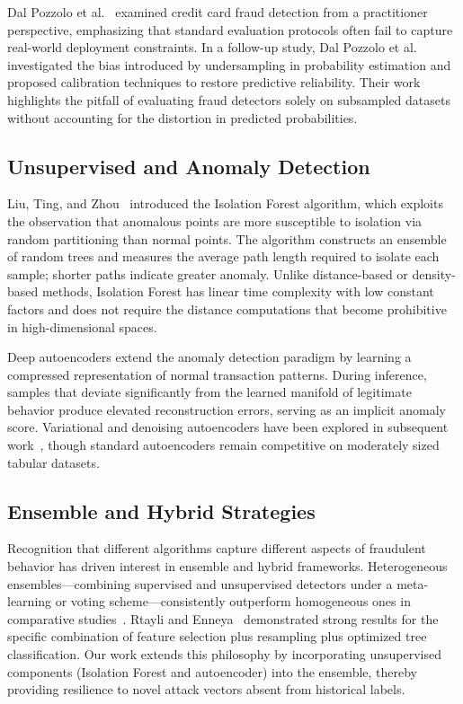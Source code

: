 \documentclass[conference,10pt]{IEEEtran}
\begin{document}
Dal Pozzolo et al.~\cite{dal2014learned} examined credit card fraud detection from a practitioner perspective, emphasizing that standard evaluation protocols often fail to capture real-world deployment constraints. In a follow-up study, Dal Pozzolo et al.~\cite{dal2015calibrating} investigated the bias introduced by undersampling in probability estimation and proposed calibration techniques to restore predictive reliability. Their work highlights the pitfall of evaluating fraud detectors solely on subsampled datasets without accounting for the distortion in predicted probabilities.

\subsection{Unsupervised and Anomaly Detection}
Liu, Ting, and Zhou~\cite{liu2008isolation} introduced the Isolation Forest algorithm, which exploits the observation that anomalous points are more susceptible to isolation via random partitioning than normal points. The algorithm constructs an ensemble of random trees and measures the average path length required to isolate each sample; shorter paths indicate greater anomaly. Unlike distance-based or density-based methods, Isolation Forest has linear time complexity with low constant factors and does not require the distance computations that become prohibitive in high-dimensional spaces.

Deep autoencoders extend the anomaly detection paradigm by learning a compressed representation of normal transaction patterns. During inference, samples that deviate significantly from the learned manifold of legitimate behavior produce elevated reconstruction errors, serving as an implicit anomaly score. Variational and denoising autoencoders have been explored in subsequent work~\cite{an2015variational,fiore2019using}, though standard autoencoders remain competitive on moderately sized tabular datasets.

\subsection{Ensemble and Hybrid Strategies}
Recognition that different algorithms capture different aspects of fraudulent behavior has driven interest in ensemble and hybrid frameworks. Heterogeneous ensembles---combining supervised and unsupervised detectors under a meta-learning or voting scheme---consistently outperform homogeneous ones in comparative studies~\cite{carcillo2018combining}. Rtayli and Enneya~\cite{rtayli2020enhanced} demonstrated strong results for the specific combination of feature selection plus resampling plus optimized tree classification. Our work extends this philosophy by incorporating unsupervised components (Isolation Forest and autoencoder) into the ensemble, thereby providing resilience to novel attack vectors absent from historical labels.
\end{document}
